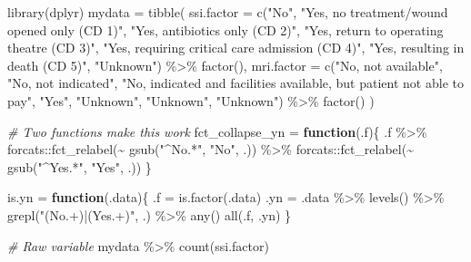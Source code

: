 \documentclass[
]{book}
\newenvironment{Shaded}{\begin{snugshade}}{\end{snugshade}}
\newcommand{\AttributeTok}[1]{\textcolor[rgb]{0.77,0.63,0.00}{#1}}
\newcommand{\CommentTok}[1]{\textcolor[rgb]{0.56,0.35,0.01}{\textit{#1}}}
\newcommand{\ControlFlowTok}[1]{\textcolor[rgb]{0.13,0.29,0.53}{\textbf{#1}}}
\newcommand{\FunctionTok}[1]{\textcolor[rgb]{0.00,0.00,0.00}{#1}}
\newcommand{\NormalTok}[1]{#1}
\newcommand{\OtherTok}[1]{\textcolor[rgb]{0.56,0.35,0.01}{#1}}
\newcommand{\SpecialCharTok}[1]{\textcolor[rgb]{0.00,0.00,0.00}{#1}}
\newcommand{\StringTok}[1]{\textcolor[rgb]{0.31,0.60,0.02}{#1}}
\begin{document}
\begin{Shaded}
\begin{Highlighting}[]
\FunctionTok{library}\NormalTok{(dplyr)}
\NormalTok{mydata }\OtherTok{=} \FunctionTok{tibble}\NormalTok{(}
  \AttributeTok{ssi.factor =} \FunctionTok{c}\NormalTok{(}\StringTok{"No"}\NormalTok{, }\StringTok{"Yes, no treatment/wound opened only (CD 1)"}\NormalTok{,    }
                 \StringTok{"Yes, antibiotics only (CD 2)"}\NormalTok{, }\StringTok{"Yes, return to operating theatre (CD 3)"}\NormalTok{, }
                 \StringTok{"Yes, requiring critical care admission (CD 4)"}\NormalTok{, }
                 \StringTok{"Yes, resulting in death (CD 5)"}\NormalTok{,}
                 \StringTok{"Unknown"}\NormalTok{) }\SpecialCharTok{\%\textgreater{}\%}
    \FunctionTok{factor}\NormalTok{(),}
  \AttributeTok{mri.factor =} \FunctionTok{c}\NormalTok{(}\StringTok{"No, not available"}\NormalTok{, }\StringTok{"No, not indicated"}\NormalTok{, }
                 \StringTok{"No, indicated and facilities available, but patient not able to pay"}\NormalTok{,}
                 \StringTok{"Yes"}\NormalTok{, }\StringTok{"Unknown"}\NormalTok{, }\StringTok{"Unknown"}\NormalTok{, }\StringTok{"Unknown"}\NormalTok{) }\SpecialCharTok{\%\textgreater{}\%} 
    \FunctionTok{factor}\NormalTok{()}
\NormalTok{)}

\CommentTok{\# Two functions make this work}
\NormalTok{fct\_collapse\_yn }\OtherTok{=} \ControlFlowTok{function}\NormalTok{(.f)\{}
\NormalTok{  .f }\SpecialCharTok{\%\textgreater{}\%} 
\NormalTok{    forcats}\SpecialCharTok{::}\FunctionTok{fct\_relabel}\NormalTok{(}\SpecialCharTok{\textasciitilde{}} \FunctionTok{gsub}\NormalTok{(}\StringTok{"\^{}No.*"}\NormalTok{, }\StringTok{"No"}\NormalTok{, .)) }\SpecialCharTok{\%\textgreater{}\%} 
\NormalTok{    forcats}\SpecialCharTok{::}\FunctionTok{fct\_relabel}\NormalTok{(}\SpecialCharTok{\textasciitilde{}} \FunctionTok{gsub}\NormalTok{(}\StringTok{"\^{}Yes.*"}\NormalTok{, }\StringTok{"Yes"}\NormalTok{, .))}
\NormalTok{\}}

\NormalTok{is.yn }\OtherTok{=} \ControlFlowTok{function}\NormalTok{(.data)\{}
\NormalTok{  .f }\OtherTok{=} \FunctionTok{is.factor}\NormalTok{(.data)}
\NormalTok{  .yn }\OtherTok{=}\NormalTok{ .data }\SpecialCharTok{\%\textgreater{}\%} 
    \FunctionTok{levels}\NormalTok{() }\SpecialCharTok{\%\textgreater{}\%} 
    \FunctionTok{grepl}\NormalTok{(}\StringTok{"(No.+)|(Yes.+)"}\NormalTok{, .) }\SpecialCharTok{\%\textgreater{}\%} 
    \FunctionTok{any}\NormalTok{()}
  \FunctionTok{all}\NormalTok{(.f, .yn)}
\NormalTok{\}}

\CommentTok{\# Raw variable}
\NormalTok{mydata }\SpecialCharTok{\%\textgreater{}\%} 
  \FunctionTok{count}\NormalTok{(ssi.factor)}
\end{Highlighting}
\end{Shaded}
\end{document}
